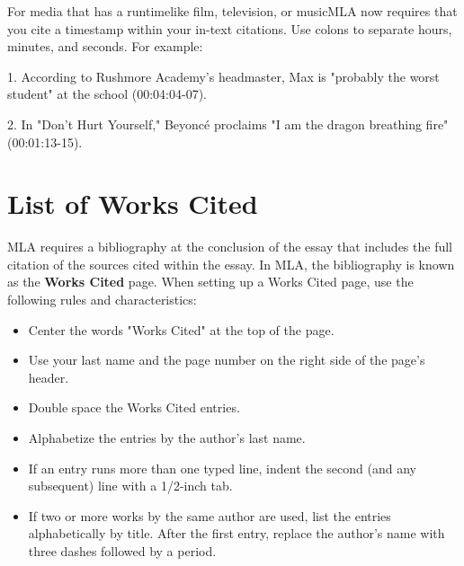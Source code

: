 \bigskip

\begin{tcolorbox}[colframe=oyster, coltitle=black, sharp corners, title=\ding{52} In-text citations for media like film or music. ]

For media that has a runtime\textemdash like film, television, or music\textemdash MLA now requires that you cite a timestamp within your in-text citations. Use colons to separate hours, minutes, and seconds. For example:

\bigskip

1. According to Rushmore Academy's headmaster, Max is "probably the worst student" at the school (00:04:04-07).

\bigskip

2. In "Don't Hurt Yourself," Beyoncé proclaims "I am the dragon breathing fire" (00:01:13-15).

\end{tcolorbox}




\section{List of Works Cited}

MLA requires a bibliography at the conclusion of the essay that includes the full 
citation of the sources cited within the essay. In MLA, the bibliography is known as the 
\textbf{Works Cited} page. When setting up a Works Cited page, use the following rules and 
characteristics:

\begin{itemize}
\item Center the words "Works Cited" at the top of the page.
\item Use your last name and the page number on the right side of the page's header.
\item Double space the Works Cited entries.
\item Alphabetize the entries by the author's last name.
\item If an entry runs more than one typed line, indent the second (and any subsequent) line with a 1/2-inch tab.
\item If two or more works by the same author are used, list the entries alphabetically by title. After the first entry, replace the author's name with three dashes followed by a period.
\end{itemize}
\newpage

